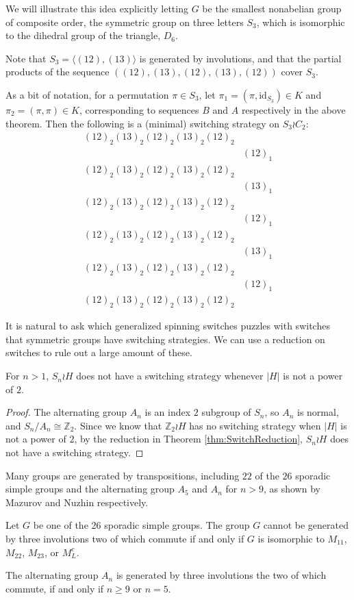 We will illustrate this idea explicitly letting $G$ be the smallest nonabelian
group of composite order, the symmetric group on three letters $S_3$, which is
isomorphic to the dihedral group of the triangle, $D_6$.
\begin{example}
  Note that $S_3 = \langle(12), (13)\rangle$ is generated by involutions, and
  that the partial products of the sequence $((12),(13),(12),(13),(12))$
  cover $S_3$.

  As a bit of notation, for a permutation $\pi \in S_3$, let
  $\pi_1 = (\pi, \mathrm{id}_{S_3}) \in K$
  and
  $\pi_2 = (\pi, \pi) \in K$, corresponding to sequences $B$ and $A$
  respectively in the above theorem.
  Then the following is a (minimal) switching strategy on $S_3 \wr C_2$:
  \begin{align*}
    (12)_2(13)_2(12)_2(13)_2(12)_2 \\
    &(12)_1 \\
    (12)_2(13)_2(12)_2(13)_2(12)_2 \\
    &(13)_1 \\
    (12)_2(13)_2(12)_2(13)_2(12)_2 \\
    &(12)_1 \\
    (12)_2(13)_2(12)_2(13)_2(12)_2 \\
    &(13)_1 \\
    (12)_2(13)_2(12)_2(13)_2(12)_2 \\
    &(12)_1 \\
    (12)_2(13)_2(12)_2(13)_2(12)_2
  \end{align*}
  \label{ex:TwoSymmetricGroups}
\end{example}
It is natural to ask which generalized spinning switches puzzles with
switches that symmetric groups have switching strategies. We can use a
reduction on switches to rule out a large amount of these.
\begin{proposition}
  For $n > 1$, $S_n \wr H$ does not have a switching strategy whenever
  $|H|$ is not a power of $2$.
\end{proposition}
\begin{proof}
  The alternating group $A_n$ is an index $2$ subgroup of $S_n$, so $A_n$ is
  normal, and $S_n/A_n \cong \mathbb Z_2$.
  Since we know that $\mathbb Z_2 \wr H$ has no switching strategy when
  $|H|$ is not a power of $2$,
  by the reduction in Theorem \ref{thm:SwitchReduction}, $S_n \wr H$ does
  not have a switching strategy.
\end{proof}

Many groups are generated by transpositions, including $22$ of the $26$
sporadic simple groups and the alternating group $A_5$ and $A_n$ for $n > 9$,
as shown by Mazurov and Nuzhin respectively.
\begin{theorem}\cite{Mazurov2003}
  Let $G$ be one of the 26 sporadic simple groups.
  The group $G$ cannot be generated by three involutions two of which commute
  if and only if $G$ is isomorphic to $M_{11}$, $M_{22}$, $M_{23}$, or $M^c_L$.
\end{theorem}
\begin{theorem}\cite{Nuzhin1992}
  The alternating group $A_n$ is generated by three involutions the
  two of which commute, if and only if $n \geq 9$ or $n = 5$.
\end{theorem}

